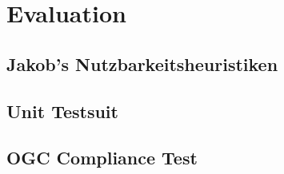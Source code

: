\newpage
\restoregeometry
\section{Evaluation}
\subsection{Jakob's Nutzbarkeitsheuristiken}
\subsection{Unit Testsuit}
\subsection{OGC Compliance Test}